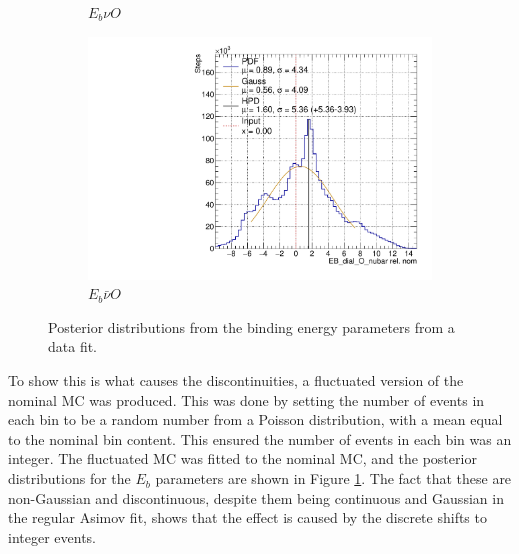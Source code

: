 \begin{figure}[t]
\begin{subfigure}{.48\textwidth}
  \caption{$E_{b}\nu O$}
\end{subfigure}
\begin{subfigure}{.48\textwidth}
  \centering
  \includegraphics[width=0.73\linewidth]{figs/EB_dial_O_nubarData}
  \caption{$E_{b}\bar{\nu}O$}
\end{subfigure}
\caption{Posterior distributions from the binding energy parameters from a data fit.}
\label{fig:Ebdata}
\end{figure}

To show this is what causes the discontinuities, a fluctuated version of the nominal MC was produced. This was done by setting the number of events in each bin to be a random number from a Poisson distribution, with a mean equal to the nominal bin content. This ensured the number of events in each bin was an integer. The fluctuated MC was fitted to the nominal MC, and the posterior distributions for the $E_b$ parameters are shown in Figure \ref{fig:Ebdata}. The fact that these are non-Gaussian and discontinuous, despite them being continuous and Gaussian in the regular Asimov fit, shows that the effect is caused by the discrete shifts to integer events.

